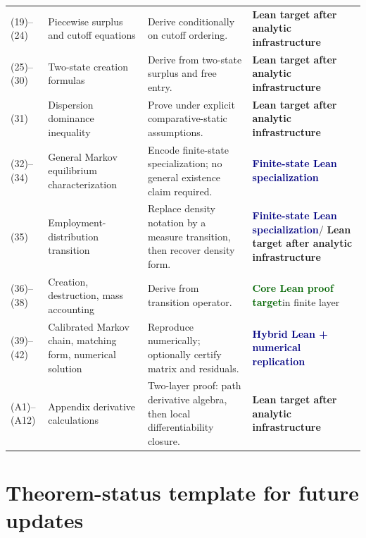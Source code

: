 \documentclass[11pt]{article}
\newcommand{\core}{\textcolor{darkGreen}{\textbf{Core Lean proof target}}}
\newcommand{\infra}{\textcolor{darkAmber}{\textbf{Lean target after analytic infrastructure}}}
\newcommand{\finite}{\textcolor{navy}{\textbf{Finite-state Lean specialization}}}
\newcommand{\hybrid}{\textcolor{navy}{\textbf{Hybrid Lean + numerical replication}}}
\begin{document}
\begin{longtable}{>{\raggedright\arraybackslash}p{} >{\raggedright\arraybackslash}p{} >{\raggedright\arraybackslash}p{} >{\raggedright\arraybackslash}p{}}
(19)--(24) & Piecewise surplus and cutoff equations & Derive conditionally on cutoff ordering. & \infra \\
(25)--(30) & Two-state creation formulas & Derive from two-state surplus and free entry. & \infra \\
(31) & Dispersion dominance inequality & Prove under explicit comparative-static assumptions. & \infra \\
(32)--(34) & General Markov equilibrium characterization & Encode finite-state specialization; no general existence claim required. & \finite \\
(35) & Employment-distribution transition & Replace density notation by a measure transition, then recover density form. & \finite / \infra \\
(36)--(38) & Creation, destruction, mass accounting & Derive from transition operator. & \core in finite layer \\
(39)--(42) & Calibrated Markov chain, matching form, numerical solution & Reproduce numerically; optionally certify matrix and residuals. & \hybrid \\
(A1)--(A12) & Appendix derivative calculations & Two-layer proof: path derivative algebra, then local differentiability closure. & \infra \\
\bottomrule
\end{longtable}
\normalsize

\section{Theorem-status template for future updates}
\end{document}
